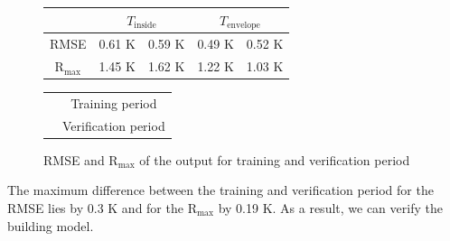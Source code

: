      \begin{figure}[h]
    \begin{minipage}[t]{0.5\textwidth}
    \vspace{0pt}
        \begin{tabular}{c|c|c|c|c}
             & \multicolumn{2}{|c}{$T_\text{inside}$} & \multicolumn{2}{|c}{$T_\text{envelope}$} \\
             \hline
            RMSE & \cellcolor{gray} 0.61 K & \cellcolor{gray90} 0.59 K & \cellcolor{gray} 0.49 K & \cellcolor{gray90} 0.52 K \\
            $\mathrm{R}_\text{max}$ &\cellcolor{gray} 1.45 K & \cellcolor{gray90} 1.62 K & \cellcolor{gray} 1.22 K & \cellcolor{gray90} 1.03 K
        \end{tabular}
    \end{minipage}
    \hfill
    \begin{minipage}[t]{0.5\textwidth}
    \vspace{0pt}
        \begin{tabular}{c c}
        \\
            &\cellcolor{gray} Training period \\
           &\cellcolor{gray90} Verification period
        \end{tabular}
    \end{minipage}
    \caption{RMSE and $\mathrm{R}_\text{max}$ of the output for training and verification period}
    \label{tab:RMSEundR}
    \end{figure}
    The maximum difference between the training and verification period for the RMSE lies by 0.3 K and for the $\mathrm{R}_\text{max}$ by 0.19 K. As a result, we can verify the building model.  

